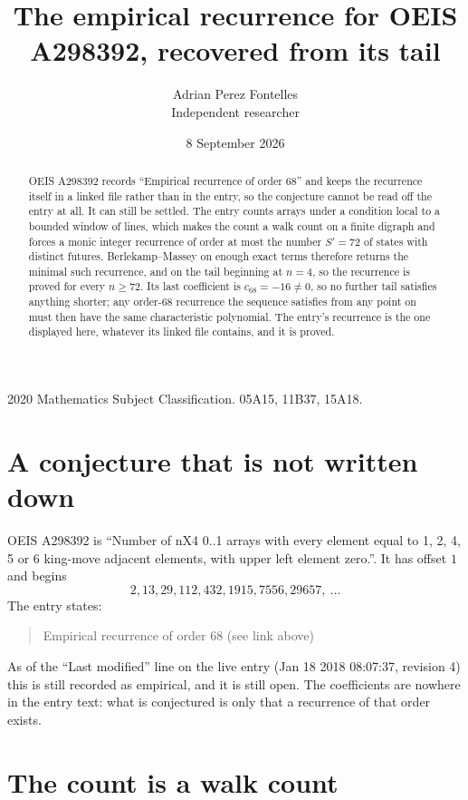 \documentclass[11pt,a4paper]{article}
\title{The empirical recurrence for OEIS A298392, recovered from its tail}
\author{Adrian Perez Fontelles\\ \small Independent researcher}
\date{8 September 2026}
\theoremstyle{plain}
\theoremstyle{definition}
\begin{document}
\maketitle

\begin{abstract}
OEIS A298392 records ``Empirical recurrence of order $68$'' and keeps the recurrence itself in
a linked file rather than in the entry, so the conjecture cannot be read off the entry at all.
It can still be settled. The entry counts arrays under a condition local to a bounded window of
lines, which makes the count a walk count on a finite digraph and forces a monic integer
recurrence of order at most the number $S'=72$ of states with distinct futures. Berlekamp--Massey on
enough exact terms therefore returns the minimal such recurrence, and on the tail beginning at $n=4$, so the recurrence is proved for every $n\ge72$.
Its last coefficient is $c_{68}=-16\neq0$, so no further tail satisfies anything
shorter; any order-$68$ recurrence the sequence satisfies from any point on must then have
the same characteristic polynomial. The entry's recurrence is the one displayed here, whatever
its linked file contains, and it is proved.
\end{abstract}

\noindent\small 2020 Mathematics Subject Classification. 05A15, 11B37, 15A18.\normalsize

\section{A conjecture that is not written down}

OEIS A298392 is ``Number of nX4 0..1 arrays with every element equal to 1, 2, 4, 5 or 6 king-move adjacent elements, with upper left element zero.''. It has offset $1$ and begins
\[
2, 13, 29, 112, 432, 1915, 7556, 29657,\ \dots
\]
The entry states:
\begin{quote}
Empirical recurrence of order 68 (see link above)
\end{quote}
As of the ``Last modified'' line on the live entry (Jan 18 2018 08:07:37, revision 4)
this is still recorded as empirical, and it is still open. The coefficients are nowhere in the
entry text: what is conjectured is only that a recurrence of that order exists.

\section{The count is a walk count}
\end{document}
